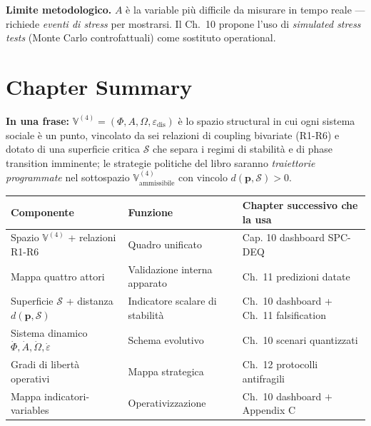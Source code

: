 \Conj{} \textbf{Limite metodologico.} \(A\) è la variable più difficile
da misurare in tempo reale --- richiede \emph{eventi di stress} per
mostrarsi. Il Ch.~10 propone l'uso di \emph{simulated stress tests}
(Monte Carlo controfattuali) come sostituto operational.



\section{Chapter Summary}\label{sintesi-del-chapter}

\Proved{} \textbf{In una frase:}
\(\mathbb{V}^{(4)} = (\Phi, A, \Omega, \varepsilon_{\text{dis}})\) è lo
spazio structural in cui ogni sistema sociale è un punto, vincolato da
sei relazioni di coupling bivariate (R1-R6) e dotato di una
superficie critica \(\mathcal{S}\) che separa i regimi di stabilità e di
phase transition imminente; le strategie politiche del libro saranno
\emph{traiettorie programmate} nel sottospazio
\(\mathbb{V}^{(4)}_{\text{ammissibile}}\) con vincolo
\(d(\boldsymbol{p}, \mathcal{S}) > 0\).

{\def\LTcaptype{none} %
{\small\begin{longtable}[]{@{}
  >{\raggedright\arraybackslash}p{}
  >{\raggedright\arraybackslash}p{}
  >{\raggedright\arraybackslash}p{}@{}}
\toprule\noalign{}
\begin{minipage}[b]{\linewidth}\raggedright
Componente
\end{minipage} & \begin{minipage}[b]{\linewidth}\raggedright
Funzione
\end{minipage} & \begin{minipage}[b]{\linewidth}\raggedright
Chapter successivo che la usa
\end{minipage} \\
\midrule\noalign{}
\endhead
\bottomrule\noalign{}
\endlastfoot
Spazio \(\mathbb{V}^{(4)}\) + relazioni R1-R6 & Quadro unificato & Cap.
10 dashboard SPC-DEQ \\
Mappa quattro attori & Validazione interna apparato & Ch.~11 predizioni
datate \\
Superficie \(\mathcal{S}\) + distanza \(d(\boldsymbol{p}, \mathcal{S})\)
& Indicatore scalare di stabilità & Ch.~10 dashboard + Ch.~11
falsification \\
Sistema dinamico \(\dot\Phi, \dot A, \dot\Omega, \dot\varepsilon\) &
Schema evolutivo & Ch.~10 scenari quantizzati \\
Gradi di libertà operativi & Mappa strategica & Ch.~12 protocolli
antifragili \\
Mappa indicatori-variables & Operativizzazione & Ch.~10 dashboard \(+\)
Appendix C \\
\end{longtable}}
}

